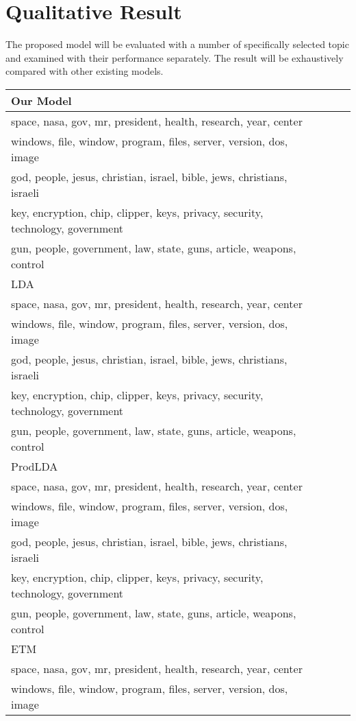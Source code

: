 \section{Qualitative Result}The proposed model will be evaluated with a number of specifically selected topic and examined with their performance separately. The result will be exhaustively compared with other existing models.
\begin{table}[]
\centering
\begin{tabular}{llll}
\hline
Our Model  \\ \hline
space, nasa, gov, mr, president, health, research, year, center\\
windows, file, window, program, files, server, version, dos, image\\
god, people, jesus, christian, israel, bible, jews, christians, israeli\\
key, encryption, chip, clipper, keys, privacy, security, technology, government\\
gun, people, government, law, state, guns, article, weapons, control
\\ \hline
LDA  \\ \hline
space, nasa, gov, mr, president, health, research, year, center\\
windows, file, window, program, files, server, version, dos, image\\
god, people, jesus, christian, israel, bible, jews, christians, israeli\\
key, encryption, chip, clipper, keys, privacy, security, technology, government\\
gun, people, government, law, state, guns, article, weapons, control
\\ \hline
ProdLDA  \\ \hline
space, nasa, gov, mr, president, health, research, year, center\\
windows, file, window, program, files, server, version, dos, image\\
god, people, jesus, christian, israel, bible, jews, christians, israeli\\
key, encryption, chip, clipper, keys, privacy, security, technology, government\\
gun, people, government, law, state, guns, article, weapons, control
\\ \hline
ETM  \\ \hline
space, nasa, gov, mr, president, health, research, year, center\\
windows, file, window, program, files, server, version, dos, image\\

\end{tabular}
\end{table}
